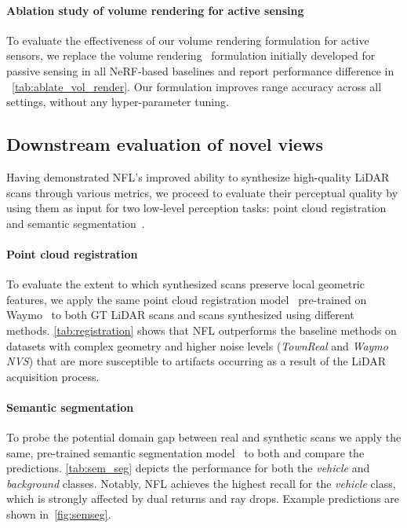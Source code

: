 \paragraph{Ablation study of volume rendering for active sensing}
To evaluate the effectiveness of our volume rendering formulation for active sensors, we replace the volume rendering~\cite{mildenhall2020nerf} formulation initially developed for passive sensing in all NeRF-based baselines and report performance difference in ~\cref{tab:ablate_vol_render}. Our formulation improves range accuracy across all settings, without any hyper-parameter tuning.







\subsection{Downstream evaluation of novel views}
\label{sec:perceptual_quality} 
Having demonstrated NFL's improved ability to synthesize high-quality LiDAR scans through various metrics, we proceed to evaluate their perceptual quality by using them as input for two low-level perception tasks: point cloud registration~\cite{huang2021predator} and semantic segmentation~\cite{tang2020searching}.


\paragraph{Point cloud registration}
To evaluate the extent to which synthesized scans preserve local geometric features, we apply the same point cloud registration model~\cite{huang2022dynamic} pre-trained on Waymo~\cite{sun2020scalability} to both GT LiDAR scans and scans synthesized using different methods. \cref{tab:registration} shows that NFL outperforms the baseline methods on datasets with complex geometry and higher noise levels (\textit{TownReal} and \textit{Waymo NVS}) that are more susceptible to artifacts occurring as a result of the LiDAR acquisition process.





\paragraph{Semantic segmentation}
To probe the potential domain gap between real and synthetic scans we apply the same, pre-trained semantic segmentation model~\cite{tang2020searching} to both and compare the predictions. \cref{tab:sem_seg} depicts the performance for both the \textit{vehicle} and \textit{background} classes. Notably, NFL achieves the highest recall for the \textit{vehicle} class, which is strongly affected by dual returns and ray drops. Example predictions are shown in~\cref{fig:semseg}.
